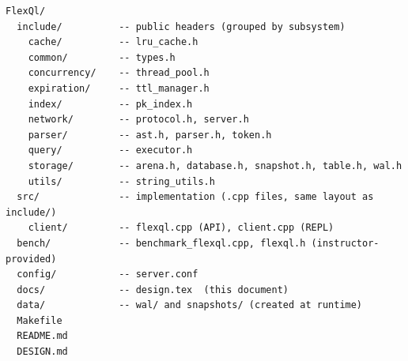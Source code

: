 \documentclass[12pt,a4paper]{article}
\begin{document}
\begin{lstlisting}[language={}]
FlexQl/
  include/          -- public headers (grouped by subsystem)
    cache/          -- lru_cache.h
    common/         -- types.h
    concurrency/    -- thread_pool.h
    expiration/     -- ttl_manager.h
    index/          -- pk_index.h
    network/        -- protocol.h, server.h
    parser/         -- ast.h, parser.h, token.h
    query/          -- executor.h
    storage/        -- arena.h, database.h, snapshot.h, table.h, wal.h
    utils/          -- string_utils.h
  src/              -- implementation (.cpp files, same layout as include/)
    client/         -- flexql.cpp (API), client.cpp (REPL)
  bench/            -- benchmark_flexql.cpp, flexql.h (instructor-provided)
  config/           -- server.conf
  docs/             -- design.tex  (this document)
  data/             -- wal/ and snapshots/ (created at runtime)
  Makefile
  README.md
  DESIGN.md
\end{lstlisting}
\end{document}

